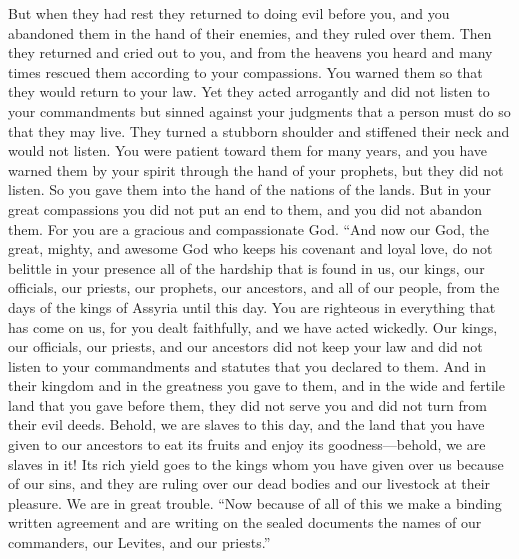 \begin{biblechapter}
\verse But when they had rest they returned to doing evil before you, and you abandoned them in the hand of their enemies, and they ruled over them. Then they returned and cried out to you, and from the heavens you heard and many times rescued them according to your compassions.
\verse You warned them so that they would return to your law. Yet they acted arrogantly and did not listen to your commandments but sinned against your judgments that a person must do so that they may live. They turned a stubborn shoulder and stiffened their neck and would not listen.
\verse You were patient toward them for many years, and you have warned them by your spirit through the hand of your prophets, but they did not listen. So you gave them into the hand of the nations of the lands.
\verse But in your great compassions you did not put an end to them, and you did not abandon them. For you are a gracious and compassionate God.
\verse “And now our God, the great, mighty, and awesome God who keeps his covenant and loyal love, do not belittle in your presence all of the hardship that is found in us, our kings, our officials, our priests, our prophets, our ancestors, and all of our people, from the days of the kings of Assyria until this day.
\verse You are righteous in everything that has come on us, for you dealt faithfully, and we have acted wickedly.
\verse Our kings, our officials, our priests, and our ancestors did not keep your law and did not listen to your commandments and statutes that you declared to them.
\verse And in their kingdom and in the greatness you gave to them, and in the wide and fertile land that you gave before them, they did not serve you and did not turn from their evil deeds.
\verse Behold, we are slaves to this day, and the land that you have given to our ancestors to eat its fruits and enjoy its goodness—behold, we are slaves in it!
\verse Its rich yield goes to the kings whom you have given over us because of our sins, and they are ruling over our dead bodies and our livestock at their pleasure. We are in great trouble.
\verse {} “Now because of all of this we make a binding written agreement and are writing on the sealed documents the names of our commanders, our Levites, and our priests.”
\end{biblechapter}

